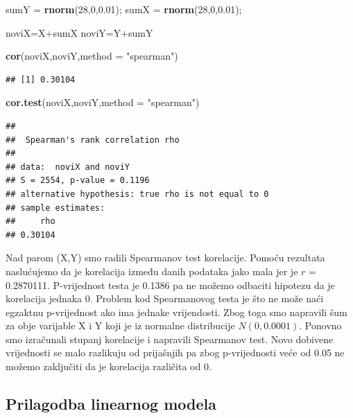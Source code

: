 \documentclass[]{article}
\newenvironment{Shaded}{\begin{snugshade}}{\end{snugshade}}
\newcommand{\KeywordTok}[1]{\textcolor[rgb]{0.13,0.29,0.53}{\textbf{{#1}}}}
\newcommand{\DataTypeTok}[1]{\textcolor[rgb]{0.13,0.29,0.53}{{#1}}}
\newcommand{\DecValTok}[1]{\textcolor[rgb]{0.00,0.00,0.81}{{#1}}}
\newcommand{\FloatTok}[1]{\textcolor[rgb]{0.00,0.00,0.81}{{#1}}}
\newcommand{\StringTok}[1]{\textcolor[rgb]{0.31,0.60,0.02}{{#1}}}
\newcommand{\NormalTok}[1]{{#1}}
\begin{document}
\begin{Shaded}
\begin{Highlighting}[]
\NormalTok{sumY =}\StringTok{ }\KeywordTok{rnorm}\NormalTok{(}\DecValTok{28}\NormalTok{,}\DecValTok{0}\NormalTok{,}\FloatTok{0.01}\NormalTok{);}
\NormalTok{sumX =}\StringTok{ }\KeywordTok{rnorm}\NormalTok{(}\DecValTok{28}\NormalTok{,}\DecValTok{0}\NormalTok{,}\FloatTok{0.01}\NormalTok{);}

\NormalTok{noviX=X+sumX}
\NormalTok{noviY=Y+sumY}

\KeywordTok{cor}\NormalTok{(noviX,noviY,}\DataTypeTok{method =} \StringTok{"spearman"}\NormalTok{)}
\end{Highlighting}
\end{Shaded}

\begin{verbatim}
## [1] 0.30104
\end{verbatim}

\begin{Shaded}
\begin{Highlighting}[]
\KeywordTok{cor.test}\NormalTok{(noviX,noviY,}\DataTypeTok{method =} \StringTok{"spearman"}\NormalTok{)}
\end{Highlighting}
\end{Shaded}

\begin{verbatim}
## 
##  Spearman's rank correlation rho
## 
## data:  noviX and noviY
## S = 2554, p-value = 0.1196
## alternative hypothesis: true rho is not equal to 0
## sample estimates:
##     rho 
## 0.30104
\end{verbatim}

Nad parom (X,Y) smo radili Spearmanov test korelacije. Pomoću rezultata
naslućujemo da je korelacija između danih podataka jako mala jer je
\(r\) = 0.2870111. P-vrijednost testa je 0.1386 pa ne možemo odbaciti
hipotezu da je korelacija jednaka 0. Problem kod Spearmanovog testa je
što ne može naći egzaktnu p-vrijednost ako ima jednake vrijendosti. Zbog
toga smo napravili šum za obje varijable X i Y koji je iz normalne
distribucije \(N (0, 0.0001)\). Ponovno smo izračunali stupanj
korelacije i napravili Spearmanov test. Novo dobivene vrijednosti se
malo razlikuju od prijašnjih pa zbog p-vrijednosti veće od 0.05 ne
možemo zaključiti da je korelacija različita od 0.

\subsection{Prilagodba linearnog
modela}\label{prilagodba-linearnog-modela}
\end{document}
